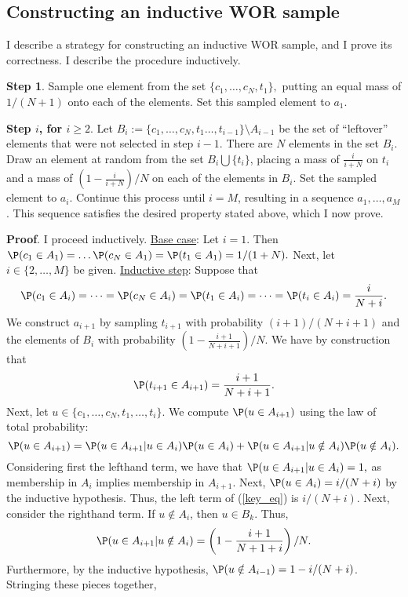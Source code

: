 \documentclass[12pt]{article}
\begin{document}
\subsection*{Constructing an inductive WOR sample}

I describe a strategy for constructing an inductive WOR sample, and I prove its correctness. I describe the procedure inductively.

\textbf{Step 1}. Sample one element from the set $\{c_1, \dots, c_N, t_1\},$ putting an equal mass of  $1/(N + 1)$ onto each of the elements. Set this sampled element to $a_1$.

\textbf{Step $i$, for $i \geq 2$}. Let $B_i := \{c_1, \dots, c_N, t_1 \dots, t_{i-1} \} \setminus A_{i-1}$ be the set of ``leftover'' elements that were not selected in step $i-1$. There are $N$ elements in the set $B_i$. Draw an element at random from the set $B_i \bigcup \{ t_i \}$, placing a mass of $\frac{i}{i + N}$ on $t_i$ and a mass of $\left(1 - \frac{i}{i + N} \right)/N$ on each of the elements in $B_i$. Set the sampled element to $a_i$. Continue this process until $i = M$, resulting in a sequence $a_1,\dots,a_M$. This sequence satisfies the desired property stated above, which I now prove.

\textbf{Proof}. I proceed inductively. \underline{Base case}: Let $i = 1$. Then $\P(c_1 \in A_1) = \dots \P(c_N \in A_1) = \P(t_1 \in A_1) = 1/(1+N).$ Next, let $i \in \{2, \dots, M \}$ be given. \underline{Inductive step}: Suppose that 
$$
\P(c_1 \in A_{i}) = \dots = \P(c_N \in A_{i}) = \P( t_1 \in A_{i} ) = \dots = \P(t_{i} \in A_{i}) = \frac{i}{N + i}.
$$
We construct $a_{i+1}$ by sampling $t_{i+1}$ with probability $(i+1)/(N + i + 1)$ and the elements of $B_i$ with probability $\left(1 - \frac{i + 1}{N+i + 1}\right)/N$. We have by construction that $$\P(t_{i+1} \in A_{i+1}) = \frac{i+1}{N+i+1}.$$ Next, let $u \in \{c_1, \dots, c_N, t_1, \dots, t_{i} \}$. We compute $\P(u \in A_{i+1})$ using the law of total probability:
\begin{equation}\label{key_eq}
\P(u \in A_{i+1}) = \P(u \in A_{i+1} | u \in A_{i}) \P(u \in A_{i}) + \P(u \in A_{i+1} | u \notin A_{i}) \P(u \notin A_{i}).
\end{equation}
Considering first the lefthand term, we have that $\P(u \in A_{i+1} | u \in A_{i}) = 1,$ as membership in $A_{i}$ implies membership in $A_{i+1}$. Next, $\P(u \in A_{i}) = i/(N + i)$ by the inductive hypothesis. Thus, the left term of (\ref{key_eq}) is
$i/(N + i).$ Next, consider the righthand term. If $u \notin A_{i}$, then $u \in B_k$. Thus, $$ \P(u \in A_{i+1} | u \notin A_{i}) = \left(1 - \frac{i+1}{N+1+i}\right)/N.$$ Furthermore, by the inductive hypothesis, $\P(u \notin A_{i-1}) = 1 - i/(N + i)$. Stringing these pieces together,
\end{document}
